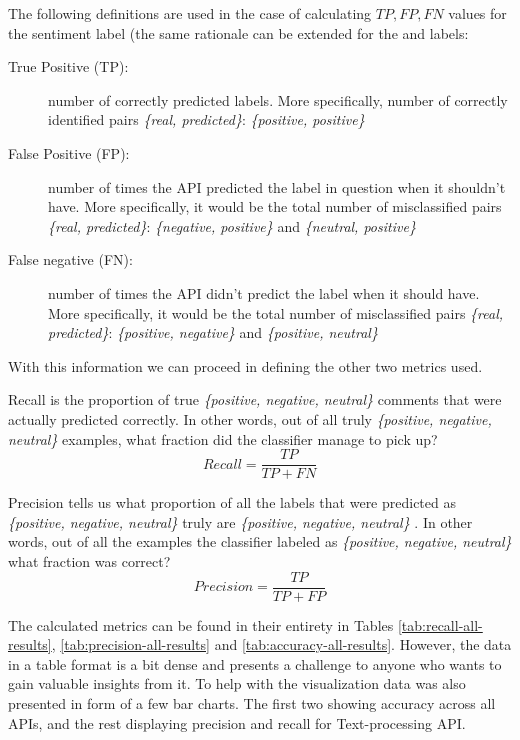 \noindent The following definitions are used in the case of calculating $TP,FP,FN$ values for the  sentiment label (the same rationale can be extended for the  and  labels:
\begin{description}
 \item[True Positive (TP):] 
 number of correctly predicted labels. 
 More specifically, number of correctly identified pairs 
 \textit{\{real, predicted\}}: \textit{\{positive, positive\}}

 \item[False Positive (FP):]  
 number of times the API predicted the label in question when it shouldn't have.
 More specifically, it would be the total number of misclassified pairs 
 \textit{\{real, predicted\}}: \textit{\{negative, positive\}} and \textit{\{neutral, positive\}}

 \item[False negative (FN):] 
 number of times the API didn't predict the label when it should have. 
 More specifically, it would be the total number of misclassified pairs 
 \textit{\{real, predicted\}}: \textit{\{positive, negative\}} and \textit{\{positive, neutral\}}
\end{description}

With this information we can proceed in defining the other two metrics used.

Recall is the proportion of true \textit{\{positive, negative, neutral\}} comments that were actually predicted correctly. In other words, out of all truly \textit{\{positive, negative, neutral\}} examples, what fraction did the classifier manage to pick up?
\[Recall = \frac{TP}{TP + FN }\]


Precision tells us what proportion of all the labels that were predicted as \textit{\{positive, negative, neutral\}} truly are \textit{\{positive, negative, neutral\}} . In other words, out of all the examples the classifier labeled as \textit{\{positive, negative, neutral\}} what fraction was correct?
\[Precision = \frac{TP}{TP + FP }\]

The calculated metrics can be found in their entirety in Tables  \ref{tab:recall-all-results}, \ref{tab:precision-all-results} and \ref{tab:accuracy-all-results}.
However, the data in a table format is a bit dense and presents a challenge to anyone who wants to gain valuable insights from it. 
To help with the visualization data was also presented in form of a few bar charts. The first two showing accuracy across all APIs, and the rest displaying precision and recall for Text-processing API.


